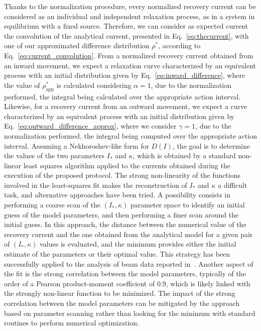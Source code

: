 {Thanks to the normalization procedure, every normalized recovery current can be considered as an individual and independent relaxation process, as in a system in equilibrium with a fixed source. Therefore, we can consider as expected current the convolution of the analytical current, presented in Eq.~\eqref{eq:thecurrent}, with one of our approximated difference distribution $\rho^\ast$, {according to Eq.~\eqref{eq:current_convolution}}. From a normalized recovery current obtained from an inward movement, we expect a relaxation curve characterized by an equivalent process with an initial distribution given by Eq.~\eqref{eq:inward_difference}, where the value of $\rho^\ast_\text{app}$ is calculated considering $\alpha=1$, due to the normalization performed, the integral being calculated over the appropriate action interval. Likewise, for a recovery current from an outward movement, we expect a curve characterized by an equivalent process with an initial distribution given by Eq.~\eqref{eq:outward_difference_approx}, where we consider $\gamma=1$, due to the normalization performed, the integral being computed over the appropriate action interval. Assuming a Nekhoroshev-like form for $D(I)$, the goal is to determine the values of the two parameters $I_\ast$ and $\kappa$, which is obtained by a standard non-linear least squares algorithm applied to the currents obtained during the execution of the proposed protocol. {The strong non-linearity of the functions involved in the least-squares fit makes the reconstruction of $I_\ast$ and $\kappa$ a difficult task, and alternative approaches have been tried. A possibility consists in performing a coarse scan of the $(I_\ast, \kappa)$ parameter space to identify an initial guess of the model parameters, and then performing a finer scan around the initial guess. In this approach, the distance between the numerical value of the recovery current and the one obtained from the analytical model for a given pair of $(I_\ast, \kappa)$ values is evaluated, and the minimum provides either the initial estimate of the parameters or their optimal value. This strategy has been successfully applied to the analysis of beam data reported in~\cite{montanari:ipac22-mopost043}. Another aspect of the fit is the strong correlation between the model parameters, typically of the order of a Pearson product-moment coefficient of $0.9$, which is likely linked with the strongly non-linear function to be minimized. The impact of the strong correlation between the model parameters can be mitigated by the approach based on parameter scanning rather than looking for the minimum with standard routines to perform numerical optimization.}

}
